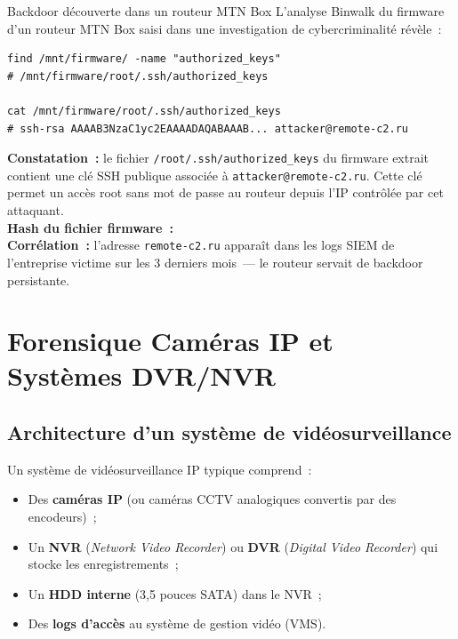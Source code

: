 \begin{boxscenario}{Backdoor découverte dans un routeur MTN Box}
L'analyse Binwalk du firmware d'un routeur MTN Box saisi dans une
investigation de cybercriminalité révèle~:

\begin{lstlisting}[language=bash_forensique]
find /mnt/firmware/ -name "authorized_keys"
# /mnt/firmware/root/.ssh/authorized_keys

cat /mnt/firmware/root/.ssh/authorized_keys
# ssh-rsa AAAAB3NzaC1yc2EAAAADAQABAAAB... attacker@remote-c2.ru
\end{lstlisting}

\textbf{Constatation~:} le fichier \texttt{/root/.ssh/authorized\_keys}
du firmware extrait contient une clé SSH publique associée à
\texttt{attacker@remote-c2.ru}. Cette clé permet un accès root sans
mot de passe au routeur depuis l'IP contrôlée par cet attaquant.\\[0.3ex]
\textbf{Hash du fichier firmware~:}
\\[0.3ex]
\textbf{Corrélation~:} l'adresse \texttt{remote-c2.ru} apparaît dans
les logs SIEM de l'entreprise victime sur les 3 derniers mois~--- le
routeur servait de backdoor persistante.
\end{boxscenario}

\section{Forensique Caméras IP et Systèmes DVR/NVR}
\label{sec:cameras-ip}

\subsection{Architecture d'un système de vidéosurveillance}

Un système de vidéosurveillance IP typique comprend~:
\begin{itemize}
    \item Des \textbf{caméras IP} (ou caméras CCTV analogiques
          convertis par des encodeurs)~;
    \item Un \textbf{NVR} (\textit{Network Video Recorder}) ou
          \textbf{DVR} (\textit{Digital Video Recorder}) qui stocke
          les enregistrements~;
    \item Un \textbf{HDD interne} (3,5 pouces SATA) dans le NVR~;
    \item Des \textbf{logs d'accès} au système de gestion vidéo (VMS).
\end{itemize}

